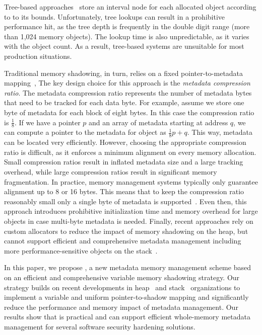 Tree-based approaches~\cite{haller2013mempick,lee2015preventing} store
an interval node for each allocated object according to to its bounds.
Unfortunately, tree lookups can result in a prohibitive performance hit,
as the tree depth is frequently in the double digit range (more than 1,024 memory objects).
The lookup time is also unpredictable, as it varies with the object count.
As a result,  tree-based systems are unsuitable
for most production situations.

Traditional memory shadowing, in turn, relies on a fixed
pointer-to-metadata mapping~\cite{akritidis2008preventing,akritidis2009baggy,younan2015freesentry},
The key design choice for this approach is the \emph{metadata compression ratio}.
The metadata compression ratio represents the number of metadata bytes that need to
be tracked for each data byte.
For example, assume we store one byte of metadata for each block of eight bytes.
In this case the compression ratio is $\frac{1}{8}$. If we have a pointer $p$ and
an array of metadata starting at address $q$, we can compute a pointer
to the metadata for object as $\frac{1}{8} p + q$.
This way, metadata can be located very efficiently.
However, choosing the appropriate
compression ratio is difficult, as it enforces a minimum alignment on every memory allocation.
Small compression ratios result in inflated metadata size and a large tracking overhead,
while large compression ratios result in significant memory fragmentation.
In practice, memory management systems typically only guarantee alignment
up to 8 or 16 bytes. This means that to keep the compression ratio reasonably
small only a single byte of metadata is supported~\cite{akritidis2008preventing,akritidis2009baggy}.
Even then, this approach introduces prohibitive initialization time and
memory overhead for large objects in case multi-byte metadata is needed.
Finally, recent approaches rely on custom
allocators to reduce the impact of memory shadowing on the heap, but
cannot support efficient and comprehensive metadata management
including more performance-sensitive objects on the stack~\cite{lee2015type}.

In this paper, we propose \projectname{}, a new metadata memory management scheme
based on an efficient and comprehensive variable memory shadowing strategy. Our
strategy builds on recent developments in heap~\cite{ghemawat2009tcmalloc} and stack~\cite{kuznetsov2014cpi} organizations
to implement a variable and uniform pointer-to-shadow mapping
and significantly reduce the performance and memory impact of metadata management.
Our results show that \projectname{} is practical and can support efficient
whole-memory metadata management for several software security hardening solutions.

